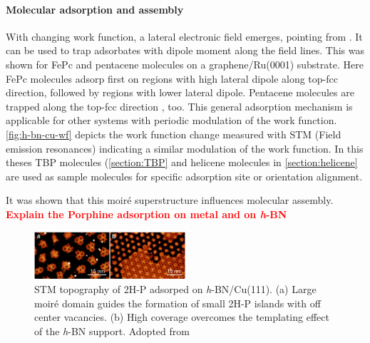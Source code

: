 \paragraph{Molecular adsorption and assembly}

With changing work function, a lateral electronic field emerges, pointing from \underline{\qquad \qquad}. It can be used to trap adsorbates with dipole moment along the field lines. This was shown for FePc and pentacene molecules on a graphene/Ru(0001) substrate. Here FePc molecules adsorp first on regions with high lateral dipole along top-fcc direction, followed by regions with lower lateral dipole. Pentacene molecules are trapped along the top-fcc direction \cite{zhang_assembly_2011}, too. This general adsorption mechanism is applicable for other systems with periodic modulation of the work function. \autoref{fig:h-bn-cu-wf} depicts the work function change measured  with STM (Field emission resonances) indicating a similar modulation of the work function. In this theses TBP molecules (\autoref{section:TBP} and helicene molecules in \autoref{section:helicene} are used as sample molecules for specific adsorption site or orientation alignment.

It was shown that this moir\'e superstructure influences molecular assembly. 
\textcolor{red}{\textbf{Explain the Porphine adsorption on metal and on \textit{h}-BN}}

\begin{figure} \centering
	\includegraphics[width=0.5\textwidth]{./images/2H-P-hBN-Cu111-joshi}%
	\caption{STM topography of 2H-P adsorped on \textit{h}-BN/Cu(111). (a) Large moir\'e domain guides the formation of small 2H-P islands with off center vacancies. (b) High coverage overcomes the templating effect of the \textit{h}-BN support. Adopted from \cite{diss-joshi}}
	\label{fig:2H-P-hBN-Cu111-joshi}
\end{figure}